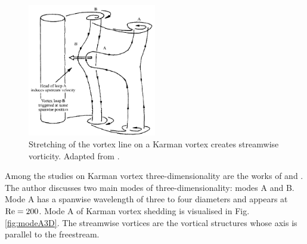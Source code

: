 \documentclass[oneside]{utmthesis}
\begin{document}
\begin{figure}[!h]
  \centering
  \hspace{1cm} \includegraphics[width=0.5\textwidth]{figs/modeA}
    \caption{Stretching of the vortex line on a Karman vortex creates streamwise vorticity. Adapted from \citet{Williamson1996a}.}
    \label{fig:modeAStretching}
  \end{figure}

Among the studies on Karman vortex three-dimensionality are the works of \citet{Williamson1996a} and  \citet{Williamson1996b}. The author discusses two main modes of three-dimensionality: modes A and B. Mode A has a spanwise wavelength of three to four diameters and appears at $\text{Re} = 200$. Mode A of Karman vortex shedding is visualised in Fig. \ref{fig:modeA3D}. The streamwise vortices are the vortical structures whose axis is parallel to the freestream.
\end{document}

